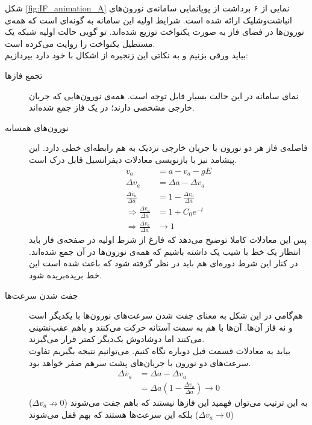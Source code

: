 \newpage
{}
شکل
\ref{fig:IF_animation_A}
نمایی از ۶ برداشت از پویانمایی سامانه‌ی نورون‌های انباشت‌وشلیک ارائه شده است. شرایط اولیه این سامانه به گونه‌ای است که همه‌ی نورون‌ها در فضای فاز به صورت یکنواخت توزیع شده‌اند. تو گویی حالت اولیه شبکه یک مستطیل یکنواخت را روایت می‌کرده است.\\
بیاید ورقی بزنیم و به نکاتی این زنجیره از اشکال با خود دارد بپردازیم:
\begin{description}
	\item[تجمع فازها] 
	نمای سامانه در این حالت بسیار قابل توجه است. همه‌ی نورون‌هایی که جریان خارجی مشخصی دارند؛ در یک فاز جمع شده‌اند.
	\item[نورون‌های همسایه] 
	 فاصله‌ی فاز هر دو نورون با جریان خارجی نزدیک به هم رابطه‌ای خطی دارد. این پیشامد نیز با بازنویسی معادلات دیفرانسیل قابل درک است.
	 \begin{align}
	 	\dot{v_a} &= a - v_a - g E\\
	 	\Delta\dot{v_a} &= \Delta a - \Delta v_a\\
	 	\frac{\Delta\dot{v_a}}{\Delta a} &= 1 - \frac{\Delta v_a}{\Delta a}\\
	 	\Rightarrow \frac{\Delta v_a}{\Delta a} &= 1 + C_0 e^{-t}\\
	 	\Rightarrow \frac{\Delta v_a}{\Delta a} &\rightarrow 1
	 \end{align}
 پس این معادلات کاملا توضیح می‌دهد که فارغ از شرط اولیه در صفحه‌ی فاز باید انتظار یک خط با شیب یک داشته باشیم که همه‌ی نورون‌ها در آن جمع شده‌اند. در کنار این شرط دوره‌ای هم باید در نظر گرفته شود که باعث شده است این خط بریده‌بریده شود.
 	\item[جفت شدن سرعت‌ها]
 	هم‌گامی در این شکل به معنای جفت شدن سرعت‌های نورون‌ها با یکدیگر است و نه فاز آن‌ها. آن‌ها با هم به سمت آستانه حرکت می‌کنند و باهم عقب‌نشینی می‌کنند اما دوشادوش یک‌دیگر کمتر قرار می‌گیرند.\\
 	بیاید به معادلات قسمت قبل دوباره نگاه کنیم. می‌توانیم نتیجه بگیریم تفاوت سرعت‌های دو نورون با جریان‌های پشت سرهم صفر خواهد بود.
 	\begin{align}
 		\Delta\dot{v_a} &= \Delta a - \Delta v_a\\
 		&= \Delta a (1 - \frac{\Delta v_a}{\Delta a}) \rightarrow 0
 	\end{align}
 	به این ترتیب می‌توان فهمید این فازها نیستند که باهم جفت می‌شوند 
 	($\Delta v_a \nrightarrow 0 $)
 	بلکه این سرعت‌ها هستند که بهم قفل می‌شوند
 	($\Delta \dot{v_a} \rightarrow 0 $)
\end{description}

